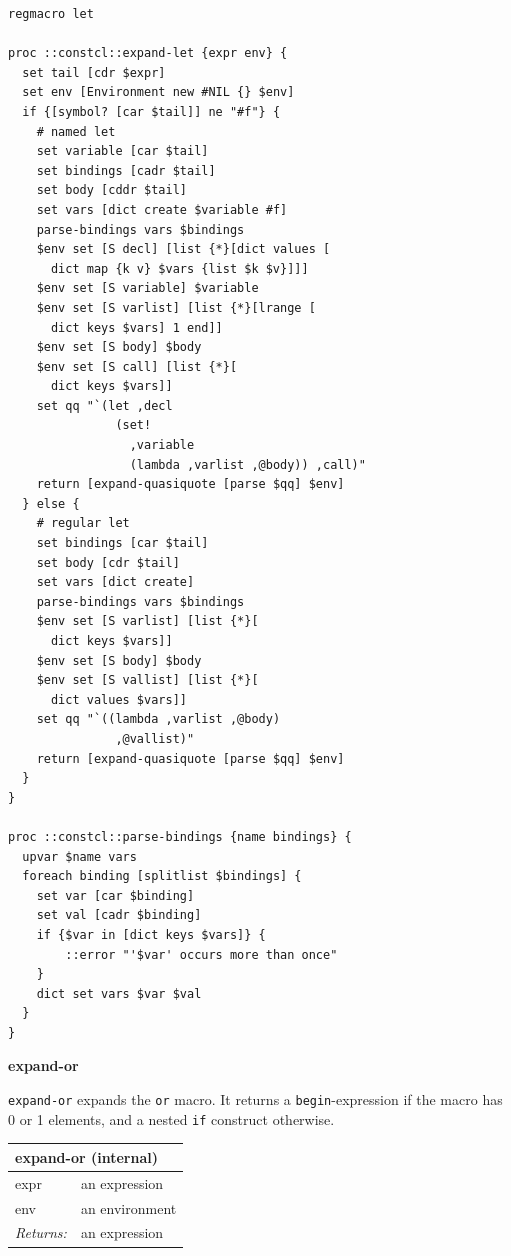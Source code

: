 \documentclass[twoside,9pt]{report}
\begin{document}
\noindent\makebox[\linewidth]{\rule{\linewidth}{0.4pt}}
\begin{lstlisting}
regmacro let
 
proc ::constcl::expand-let {expr env} {
  set tail [cdr $expr]
  set env [Environment new #NIL {} $env]
  if {[symbol? [car $tail]] ne "#f"} {
    # named let
    set variable [car $tail]
    set bindings [cadr $tail]
    set body [cddr $tail]
    set vars [dict create $variable #f]
    parse-bindings vars $bindings
    $env set [S decl] [list {*}[dict values [
      dict map {k v} $vars {list $k $v}]]]
    $env set [S variable] $variable
    $env set [S varlist] [list {*}[lrange [
      dict keys $vars] 1 end]]
    $env set [S body] $body
    $env set [S call] [list {*}[
      dict keys $vars]]
    set qq "`(let ,decl
               (set!
                 ,variable
                 (lambda ,varlist ,@body)) ,call)"
    return [expand-quasiquote [parse $qq] $env]
  } else {
    # regular let
    set bindings [car $tail]
    set body [cdr $tail]
    set vars [dict create]
    parse-bindings vars $bindings
    $env set [S varlist] [list {*}[
      dict keys $vars]]
    $env set [S body] $body
    $env set [S vallist] [list {*}[
      dict values $vars]]
    set qq "`((lambda ,varlist ,@body)
               ,@vallist)"
    return [expand-quasiquote [parse $qq] $env]
  }
}
 
proc ::constcl::parse-bindings {name bindings} {
  upvar $name vars
  foreach binding [splitlist $bindings] {
    set var [car $binding]
    set val [cadr $binding]
    if {$var in [dict keys $vars]} {
        ::error "'$var' occurs more than once"
    }
    dict set vars $var $val
  }
}
\end{lstlisting}
\noindent\makebox[\linewidth]{\rule{\linewidth}{0.4pt}}

\textbf{expand-or}


\texttt{expand-or} expands the \texttt{or} macro. It returns a \texttt{begin}-expression if the macro has 0 or 1 elements, and a nested \texttt{if} construct otherwise.

\begin{tabular}{ |l l| }
\hline
\multicolumn{2}{|l|}{expand-or (internal)} \\
\hline
expr & an expression \\
env & an environment \\
\textit{Returns:} & an expression \\
\hline
\end{tabular}
\end{document}
